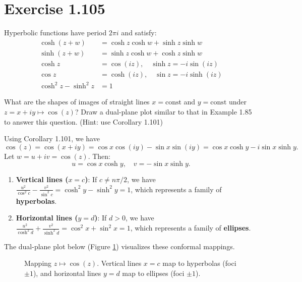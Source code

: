 \documentclass{article}
\begin{document}
\section{Exercise 1.105}

\begin{corollary}
  Hyperbolic functions have period $2\pi i$ and satisfy:
  \begin{align*}
    \cosh(z+w)       & = \cosh z \cosh w + \sinh z \sinh w \\
    \sinh(z+w)       & = \sinh z \cosh w + \cosh z \sinh w \\
    \cosh z          & = \cos(iz), \quad \sinh z = -i \sin(iz) \\
    \cos z           & = \cosh(iz), \quad \sin z = -i \sinh(iz) \\
    \cosh^2 z - \sinh^2 z & = 1
  \end{align*}
\end{corollary}

What are the shapes of images of straight lines $x = \text{const}$
and $y = \text{const}$ under $z = x + iy \mapsto \cos(z)$? Draw a
dual-plane plot similar to that in Example 1.85 to answer this
question. (Hint: use Corollary 1.101)

\begin{solution}
  Using Corollary 1.101, we have
  \[
    \cos(z) = \cos(x + iy) = \cos x \cos(iy) - \sin x \sin(iy) = \cos x \cosh y - i \sin x \sinh y.
  \]
  Let $w = u + iv = \cos(z)$. Then:
  \[
    u = \cos x \cosh y, \quad v = -\sin x \sinh y.
  \]
  
  \begin{enumerate}
    \item \textbf{Vertical lines ($x = c$)}:
    If $c \neq n\pi/2$, we have $\frac{u^2}{\cos^2 c} - \frac{v^2}{\sin^2 c} = \cosh^2 y - \sinh^2 y = 1$, which represents a family of \textbf{hyperbolas}.
    \item \textbf{Horizontal lines ($y = d$)}:
    If $d > 0$, we have $\frac{u^2}{\cosh^2 d} + \frac{v^2}{\sinh^2 d} = \cos^2 x + \sin^2 x = 1$, which represents a family of \textbf{ellipses}.
  \end{enumerate}

  The dual-plane plot below (Figure \ref{fig:mapping_cos}) visualizes these conformal mappings.

  \begin{figure}[htbp]
    \centering
    \resizebox{0.9\textwidth}{!}{}
    \caption{Mapping $z \mapsto \cos(z)$. Vertical lines $x=c$ map to hyperbolas (foci $\pm 1$), and horizontal lines $y=d$ map to ellipses (foci $\pm 1$).}
    \label{fig:mapping_cos}
  \end{figure}
\end{solution}
\end{document}
